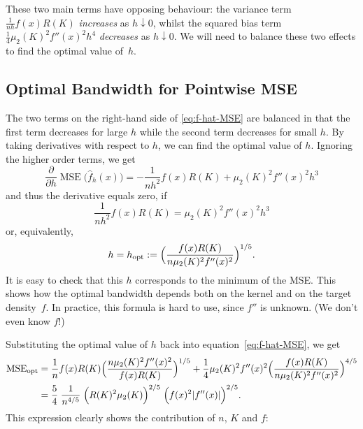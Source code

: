 \documentclass[
  a4paper,
]{article}
\theoremstyle{definition}
\theoremstyle{definition}
\theoremstyle{definition}
\theoremstyle{definition}
\theoremstyle{remark}
\begin{document}
These two main terms have opposing behaviour: the variance term
\(\frac{1}{nh} f(x) R(K)\) \emph{increases} as \(h \downarrow 0\), whilst the squared
bias term \(\frac14 \mu_2(K)^2 f''(x)^2 h^4\) \emph{decreases} as \(h \downarrow 0\).
We will need to balance these two effects to find the optimal value of~\(h\).

\subsection{Optimal Bandwidth for Pointwise MSE}\label{optimal-bandwidth-for-pointwise-mse}

The two terms on the right-hand side of \eqref{eq:f-hat-MSE} are balanced in
that the first term decreases for large \(h\) while the second term decreases for
small \(h\). By taking derivatives with respect to \(h\), we can
find the optimal value of \(h\). Ignoring the higher order terms, we get
\begin{equation*}
  \frac{\partial}{\partial h} \mathop{\mathrm{MSE}}\nolimits\bigl( \hat f_h(x) \bigr)
  = -\frac{1}{nh^2} f(x) R(K) + \mu_2(K)^2 f''(x)^2 h^3
\end{equation*}
and thus the derivative equals zero, if
\begin{equation*}
  \frac{1}{nh^2} f(x) R(K) = \mu_2(K)^2 f''(x)^2 h^3
\end{equation*}
or, equivalently,
\begin{equation*}
  h
  = h_\mathrm{opt}
  := \Bigl( \frac{f(x) R(K)}{n \mu_2(K)^2 f''(x)^2} \Bigr)^{1/5}.
\end{equation*}
It is easy to check that this \(h\) corresponds to the minimum of the MSE.
This shows how the optimal bandwidth depends both on the kernel and on
the target density~\(f\). In practice, this formula is hard to use,
since \(f''\) is unknown. (We don't even know \(f\)!)

Substituting the optimal value of \(h\) back into equation~\eqref{eq:f-hat-MSE},
we get
\begin{align*}
  \mathop{\mathrm{MSE}}\nolimits_\mathrm{opt}
  &= \frac{1}{n} f(x) R(K) \Bigl( \frac{n \mu_2(K)^2 f''(x)^2}{f(x) R(K)} \Bigr)^{1/5}
     + \frac14 \mu_2(K)^2 f''(x)^2 \Bigl( \frac{f(x) R(K)}{n \mu_2(K)^2 f''(x)^2} \Bigr)^{4/5} \\
  &= \frac54 \; \frac{1}{n^{4/5}}
      \; \Bigl( R(K)^2 \mu_2(K) \Bigr)^{2/5}
      \; \Bigl( f(x)^2 |f''(x)| \Bigr)^{2/5}.
\end{align*}
This expression clearly shows the contribution of \(n\), \(K\) and \(f\):
\end{document}
